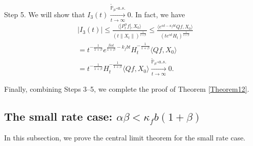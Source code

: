 \documentclass[12pt,a4paper]{amsart}
\theoremstyle{plain}
\theoremstyle{definition}
\numberwithin{equation}{section}
\begin{document}
	Step 5. We will show that $I_3(t) \xrightarrow[t\to \infty]{\tilde {\mathbb P}_\mu \text{-} a.s.} 0$.
In fact, we have
\begin{equation}\begin{split}
	&|I_3(t)|
\leq \frac{\langle |P^\alpha_tf|,X_0\rangle}{(t\|X_t\|)^{\frac{1}{1+\beta}}}
	\leq \frac{\langle e^{\alpha t - \kappa_f b t}Qf,X_0\rangle}{(te^{\alpha t} H_t)^{\frac{1}{1+\beta}}}
	\\& = t^{-\frac{1}{1+\beta}} e^{\frac{\beta \alpha t}{1+\beta} - k_fbt} H_t^{-\frac{1}{1+\beta}} \langle Qf,X_0\rangle
	\\& = t^{-\frac{1}{1+\beta}} H_t^{-\frac{1}{1+\beta}} \langle Qf,X_0\rangle
	\xrightarrow[t\to \infty]{\tilde {\mathbb P}_\mu \text{-} a.s.} 0.
\end{split}\end{equation}

	Finally, combining Steps 3--5, we complete the proof of Theorem \ref{Theorem12}.

\subsection{The small rate case: $\alpha\beta<\kappa_fb(1+\beta)$}
 In this subsection, we prove the central limit theorem for the small rate case.
\end{document}
